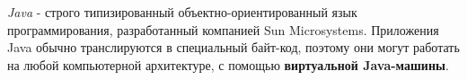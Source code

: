 \begin{frame}
	\frametitle{\insertsection} 
	\framesubtitle{\insertsubsection}
	\textit{Java} - строго типизированный объектно-ориентированный язык программирования, разработанный 
	компанией Sun Microsystems. Приложения Java обычно транслируются в специальный байт-код, поэтому 
	они могут работать на любой компьютерной архитектуре, с помощью \textbf{виртуальной Java-машины}.
\end{frame}
